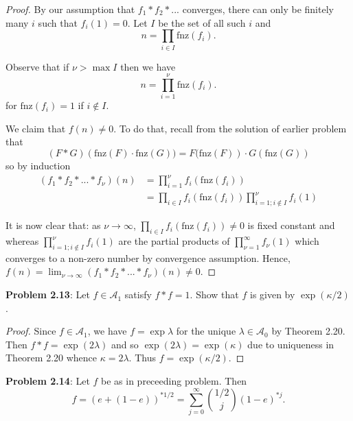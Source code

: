 \documentclass{article}
\newcommand{\fnz}{\text{fnz}}
\newcommand{\A}{\mathcal{A}}
\begin{document}
\begin{proof}
By our assumption that $f_1 * f_2 * ...$ converges, there can only be finitely many $i$ such that $f_i(1) = 0$. Let $I$ be the set of all such $i$ and
$$n = \prod_{i \in I} \fnz(f_i).$$

Observe that if $\nu > \max I$ then we have
$$n = \prod_{i = 1}^{\nu} \fnz(f_i).$$
for $\fnz(f_i) = 1$ if $i \not\in I$.

We claim that $f(n) \not= 0$. To do that, recall from the solution of earlier problem that
$$(F * G)\left(\fnz(F) \cdot \fnz(G)) = F(\fnz(F)\right) \cdot G(\fnz(G))$$
so by induction
\begin{align*}
(f_1 * f_2 * ... * f_\nu)(n) &= \prod_{i=1}^{\nu} f_i(\fnz(f_i))\\
&= \prod_{i \in I} f_i(\fnz(f_i)) \prod_{i=1; i \not\in I}^{\nu} f_i(1)
\end{align*}

It is now clear that: as $\nu \rightarrow \infty$, $\prod_{i \in I} f_i(\fnz(f_i)) \not= 0$ is fixed constant and whereas $\prod_{i=1; i \not\in I}^{\nu} f_i(1)$ are the partial products of $\prod_{\nu=1}^{\infty} f_\nu(1)$ which converges to a non-zero number by convergence assumption. Hence, $f(n) = \lim_{\nu \rightarrow \infty} (f_1 * f_2 * ... * f_\nu)(n) \not= 0$.
\end{proof}

\textbf{Problem 2.13}: Let $f \in \A_1$ satisfy $f * f = 1$. Show that $f$ is given by $\exp(\kappa/2)$.

\begin{proof}
Since $f \in \A_1$, we have $f = \exp \lambda$ for the unique $\lambda \in \A_0$ by Theorem 2.20. Then
$f * f = \exp(2 \lambda)$ and so $\exp(2 \lambda) = \exp(\kappa)$ due to uniqueness in Theorem 2.20 whence $\kappa = 2 \lambda$. Thus $f = \exp(\kappa/2)$.
\end{proof}

\textbf{Problem 2.14}: Let $f$ be as in preceeding problem. Then
$$f = (e + (1 - e))^{*1/2} = \sum_{j = 0}^{\infty} \binom{1/2}{j} (1 - e)^{*j}.$$
\end{document}
